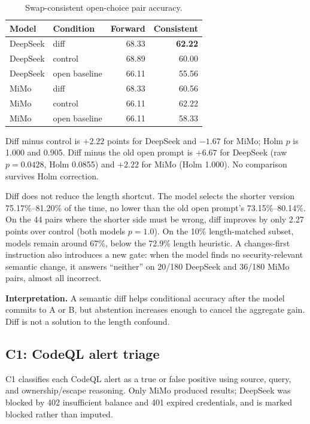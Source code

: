 \documentclass[conference]{IEEEtran}
\newcommand{\best}[1]{\textbf{#1}}
\begin{document}
\begin{table}[t]
\centering
\caption{Swap-consistent open-choice pair accuracy.}
\label{tab:pairdiff}
\footnotesize
\setlength{\tabcolsep}{3pt}
\begin{tabular}{@{}llrr@{}}
\toprule
Model & Condition & Forward & Consistent \\
\midrule
DeepSeek & diff & 68.33 & \best{62.22} \\
DeepSeek & control & 68.89 & 60.00 \\
DeepSeek & open baseline & 66.11 & 55.56 \\
MiMo & diff & 68.33 & 60.56 \\
MiMo & control & 66.11 & 62.22 \\
MiMo & open baseline & 66.11 & 58.33 \\
\bottomrule
\end{tabular}
\end{table}

Diff minus control is $+2.22$ points for DeepSeek and $-1.67$ for MiMo; Holm $p$ is 1.000 and 0.905. Diff minus the old open prompt is $+6.67$ for DeepSeek (raw $p=0.0428$, Holm 0.0855) and $+2.22$ for MiMo (Holm 1.000). No comparison survives Holm correction.

Diff does not reduce the length shortcut. The model selects the shorter version 75.17\%--81.20\% of the time, no lower than the old open prompt's 73.15\%--80.14\%. On the 44 pairs where the shorter side must be wrong, diff improves by only 2.27 points over control (both models $p=1.0$). On the 10\% length-matched subset, models remain around 67\%, below the 72.9\% length heuristic. A changes-first instruction also introduces a new gate: when the model finds no security-relevant semantic change, it answers ``neither'' on 20/180 DeepSeek and 36/180 MiMo pairs, almost all incorrect.

\textbf{Interpretation.} A semantic diff helps conditional accuracy after the model commits to A or B, but abstention increases enough to cancel the aggregate gain. Diff is not a solution to the length confound.

\subsection{C1: CodeQL alert triage}

C1 classifies each CodeQL alert as a true or false positive using source, query, and ownership/escape reasoning. Only MiMo produced results; DeepSeek was blocked by 402 insufficient balance and 401 expired credentials, and is marked blocked rather than imputed.
\end{document}
